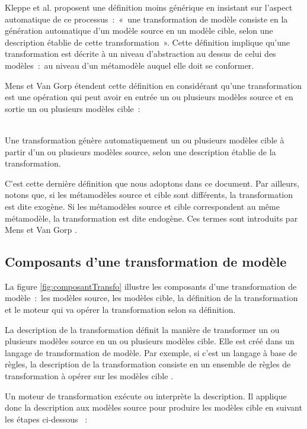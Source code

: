 Kleppe et al. \cite{kleppe2003mda} proposent une définition moins générique en insistant sur l'aspect automatique de ce processus~:~«~une transformation de modèle 
consiste en la génération automatique d'un modèle source en un modèle cible, 
selon une description établie de cette transformation~». Cette définition 
implique qu'une transformation est décrite à un niveau 
d'abstraction au dessus de celui des modèles~:~au niveau d'un métamodèle auquel elle doit se conformer. 

Mens et Van Gorp \cite{mens2006taxonomy} étendent cette définition en considérant qu'une 
transformation est une opération qui peut avoir en entrée un ou plusieurs 
modèles source et en sortie un ou plusieurs modèles cible~: 
\\\

\begin{definition}
Une transformation génère automatiquement un ou plusieurs modèles cible à partir 
d'un ou plusieurs modèles source, selon une description établie de la 
transformation. 
\end{definition}

C'est cette dernière définition que nous adoptons dans ce document. Par 
ailleurs, notons que, si les métamodèles source et cible sont différents, la 
transformation est dite exogène. Si les métamodèles source et cible 
correspondent au même métamodèle, la transformation est dite endogène. Ces 
termes sont introduits par Mens et Van Gorp \cite{mens2006taxonomy}.

\subsection{Composants d'une transformation de modèle} 
La figure \ref{fig:composantTransfo} illustre les composants d'une 
transformation de modèle~:~les modèles source, les modèles cible, la définition 
de la transformation et le moteur qui va opérer la transformation selon sa 
définition. 

La description de la transformation définit la manière de transformer un ou plusieurs modèles source en un ou plusieurs modèles cible. Elle est créé dans 
un langage de transformation de modèle. Par exemple, si c'est un langage à base 
de règles, la description de la transformation consiste en un ensemble de règles 
de transformation à opérer sur les modèles cible \cite{kleppe2003mda}. 

Un moteur de transformation exécute ou interprète la description. Il applique 
donc la description aux modèles source pour produire les modèles cible en 
suivant les étapes ci-dessous \cite{tratt2005model}~:

